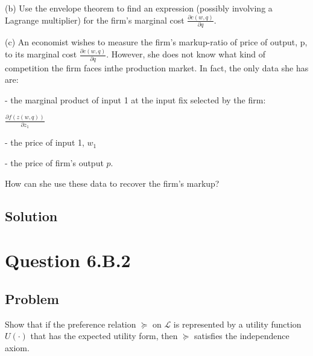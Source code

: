 \documentclass[10pt, a4paper]{article}
\begin{document}
      (b) Use the envelope theorem to find an expression (possibly involving a Lagrange multiplier) for the firm's marginal cost $\frac{\partial c(w,q)}{\partial q}$.

      (c) An economist wishes to measure the firm's markup-ratio of price of output, p, to its marginal cost $\frac{\partial c(w,q)}{\partial q}$. However, she does not know what kind of competition the firm faces inthe production market. In fact, the only data she has are:
        
        - the marginal product of input 1 at the input fix selected by the firm:
        \begin{center}
          $\frac{\partial f(z(w,q))}{\partial z_1}$
        \end{center}

        - the price of input 1, $w_1$

        - the price of firm's output $p$.

      How can she use these data to recover the firm's markup?
    \subsection{Solution}
      
  \section{Question 6.B.2}
    \subsection{Problem}
      Show that if the preference relation $\succeq$ on $\mathcal{L}$ is represented by a utility function $U(\cdot)$ that has the expected utility form, then $\succeq$ satisfies the independence axiom. 
\end{document}
